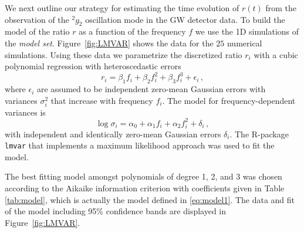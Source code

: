 We next outline our strategy for estimating the time evolution of $r(t)$
from the observation of the $\mbox{}^2g_2$ oscillation mode in the GW detector data.
To build the model of the ratio $r$ as a function of the frequency $f$ we use the 
1D simulations of the {\it model set}. Figure~\ref{fig:LMVAR}
shows the data for the $25$ numerical simulations. 
Using these data we parametrize the discretized ratio $r_i$ with a cubic polynomial
regression with heteroscedastic errors
\begin{equation}
\label{eq:model1}
r_i=\beta_1 f_i + \beta_2 f_i^2 +\beta_3 f_i^3 + \epsilon_i\,,
\end{equation}
where $\epsilon_i$ are assumed to be independent zero-mean Gaussian errors with
variances $\sigma_i^2$ that increase with frequency $f_i$. The model for frequency-dependent
variances is
\begin{equation}
\log \sigma_i=\alpha_0+ \alpha_1 f_i + \alpha_2 f_i^2 + \delta_i\,,
\end{equation}
with independent and identically zero-mean Gaussian errors $\delta_i$. The R-package \texttt{lmvar}
\cite{lmvar:2019} that implements a maximum likelihood approach was used to fit the model.

The best fitting model amongst polynomials of degree 1, 2, and 3  was chosen according to
the Aikaike information criterion with coefficients given in Table \ref{tab:model}, which is actually the model defined in \eqref{eq:model1}.  The data and fit of the model including 95\% confidence bands are displayed in
Figure~\ref{fig:LMVAR}.


